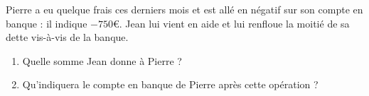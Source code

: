 
\begin{exercice}\label{exosmath-0899}

    Pierre a eu quelque frais ces derniers mois et est allé en négatif sur son compte en banque : il indique \( -750\)€. Jean lui vient en aide et lui renfloue la moitié de sa dette vis-à-vis de la banque.

    \begin{enumerate}
        \item
    Quelle somme Jean donne à Pierre ?
\item
    Qu'indiquera le compte en banque de Pierre après cette opération ?
    \end{enumerate}

\end{exercice}
